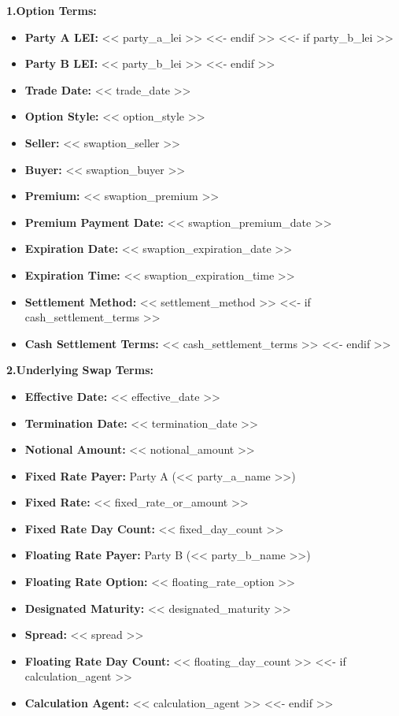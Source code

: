 \documentclass[11pt, a4paper]{article}
\begin{document}
\vspace{0.3cm}
\noindent \textbf{1.\quad Option Terms:}
\begin{itemize}[leftmargin=2cm, label={}, itemsep=3pt]
<<- if party_a_lei >>
    \item \textbf{Party A LEI:} << party_a_lei >>
<<- endif >>
<<- if party_b_lei >>
    \item \textbf{Party B LEI:} << party_b_lei >>
<<- endif >>
    \item \textbf{Trade Date:} << trade_date >>
    \item \textbf{Option Style:} << option_style >>
    \item \textbf{Seller:} << swaption_seller >>
    \item \textbf{Buyer:} << swaption_buyer >>
    \item \textbf{Premium:} << swaption_premium >>
    \item \textbf{Premium Payment Date:} << swaption_premium_date >>
    \item \textbf{Expiration Date:} << swaption_expiration_date >>
    \item \textbf{Expiration Time:} << swaption_expiration_time >>
    \item \textbf{Settlement Method:} << settlement_method >>
<<- if cash_settlement_terms >>
    \item \textbf{Cash Settlement Terms:} << cash_settlement_terms >>
<<- endif >>
\end{itemize}

\vspace{0.3cm}
\noindent \textbf{2.\quad Underlying Swap Terms:}
\begin{itemize}[leftmargin=2cm, label={}, itemsep=3pt]
    \item \textbf{Effective Date:} << effective_date >>
    \item \textbf{Termination Date:} << termination_date >>
    \item \textbf{Notional Amount:} << notional_amount >>
    \item \textbf{Fixed Rate Payer:} Party A (<< party_a_name >>)
    \item \textbf{Fixed Rate:} << fixed_rate_or_amount >>
    \item \textbf{Fixed Rate Day Count:} << fixed_day_count >>
    \item \textbf{Floating Rate Payer:} Party B (<< party_b_name >>)
    \item \textbf{Floating Rate Option:} << floating_rate_option >>
    \item \textbf{Designated Maturity:} << designated_maturity >>
    \item \textbf{Spread:} << spread >>
    \item \textbf{Floating Rate Day Count:} << floating_day_count >>
<<- if calculation_agent >>
    \item \textbf{Calculation Agent:} << calculation_agent >>
<<- endif >>
\end{itemize}
\end{document}
